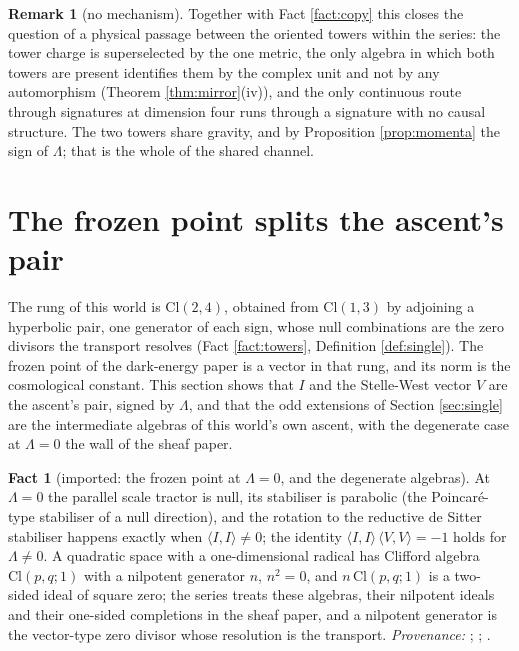 \documentclass[11pt]{article}
\theoremstyle{definition}
\newtheorem{remark}[theorem]{Remark}
\newtheorem{fact}[theorem]{Fact}
\newcommand{\Cl}{\mathrm{Cl}}
\newcommand{\ip}[2]{\langle #1, #2\rangle}
\begin{document}
\begin{remark}[no mechanism]\label{rem:nomech}
Together with Fact \ref{fact:copy} this closes the question of a physical passage between the oriented towers within the series: the tower charge is superselected by the one metric, the only algebra in which both towers are present identifies them by the complex unit and not by any automorphism (Theorem \ref{thm:mirror}(iv)), and the only continuous route through signatures at dimension four runs through a signature with no causal structure. The two towers share gravity, and by Proposition \ref{prop:momenta} the sign of $\Lambda$; that is the whole of the shared channel.
\end{remark}

\section{The frozen point splits the ascent's pair}\label{sec:pair}

The rung of this world is $\Cl(2,4)$, obtained from $\Cl(1,3)$ by adjoining a hyperbolic pair, one generator of each sign, whose null combinations are the zero divisors the transport resolves (Fact \ref{fact:towers}, Definition \ref{def:single}). The frozen point of the dark-energy paper is a vector in that rung, and its norm is the cosmological constant. This section shows that $I$ and the Stelle-West vector $V$ are the ascent's pair, signed by $\Lambda$, and that the odd extensions of Section \ref{sec:single} are the intermediate algebras of this world's own ascent, with the degenerate case at $\Lambda = 0$ the wall of the sheaf paper.

\begin{fact}[imported: the frozen point at $\Lambda = 0$, and the degenerate algebras]\label{fact:null}
At $\Lambda = 0$ the parallel scale tractor is null, its stabiliser is parabolic (the Poincar\'e-type stabiliser of a null direction), and the rotation to the reductive de Sitter stabiliser happens exactly when $\ip{I}{I} \neq 0$; the identity $\ip{I}{I}\,\ip{V}{V} = -1$ holds for $\Lambda \neq 0$. A quadratic space with a one-dimensional radical has Clifford algebra $\Cl(p,q;1)$ with a nilpotent generator $n$, $n^{2} = 0$, and $n\,\Cl(p,q;1)$ is a two-sided ideal of square zero; the series treats these algebras, their nilpotent ideals and their one-sided completions in the sheaf paper, and a nilpotent generator is the vector-type zero divisor whose resolution is the transport. \emph{Provenance:} \cite[Fact~2.1, Thm.~3.1]{ButlerT10}; \cite[Thm.~3.1, Prop.~3.4, Thm.~4.4]{ButlerT4}; \cite[\S 4]{ButlerT1}.
\end{fact}
\end{document}
